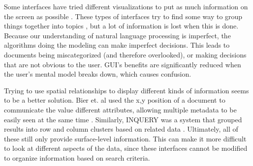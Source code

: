 \documentclass{article}
\begin{document}
Some interfaces have tried different visualizations to put as much information on the screen as possible \cite{Newman2010} \cite{Nowell1996} \cite{Shneiderman2000} \cite{Yost2006}.  These types of interfaces try to find some way to group things together into topics \cite{Newman2010}, but a lot of information is lost when this is done\cite{Nowell1996}.  Because our understanding of natural language processing is imperfect, the algorithms doing the modeling can make imperfect decisions.  This leads to documents being miscategorized (and therefore overlooked), or making decisions that are not obvious to the user.  GUI's benefits are significantly reduced when the user's mental model breaks down, which causes confusion.  

Trying to use spatial relationships to display different kinds of information seems to be a better solution\cite{Bier2005}\cite{Foo2007:ECDL}\cite{Foo2007:ICADL}\cite{Mothe1998}.   Bier et. al used the x,y position of a document to communicate the value different attributes, allowing multiple metadata to be easily seen at the same time \cite{Bier2005}.  %
Similarly, INQUERY was a system that grouped results into row and column clusters based on related data \cite{Mothe1998}.  Ultimately, all of these still only provide surface-level information.  This can make it more difficult to look at different aspects of the data, since these interfaces cannot be modified to organize information based on search criteria.
 

\end{document}
